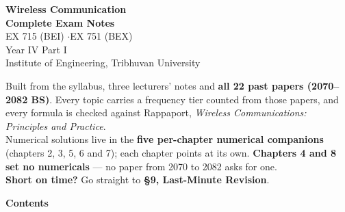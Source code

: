 \documentclass[10pt]{article}
\begin{document}
\thispagestyle{empty}
\vspace*{2.0cm}
\begin{center}
  {\Huge\bfseries\color{acc} Wireless Communication}\\[6pt]
  {\LARGE\bfseries Complete Exam Notes}\\[14pt]
  {\large\color{sub} EX 715 (BEI) \quad$\cdot$\quad EX 751 (BEX)}\\[3pt]
  {\color{sub} Year IV Part I}\\[3pt]
  {\color{sub} Institute of Engineering, Tribhuvan University}\\[20pt]
  \begin{minipage}{0.78\textwidth}
    \color{sub}\small
    Built from the syllabus, three lecturers' notes and \textbf{all 22 past papers
    (2070--2082 BS)}. Every topic carries a frequency tier counted from those papers,
    and every formula is checked against Rappaport, \emph{Wireless Communications:
    Principles and Practice}.\\[8pt]
    Numerical solutions live in the \textbf{five per-chapter numerical companions}
    (chapters 2, 3, 5, 6 and 7); each chapter points at its own.
    \textbf{Chapters 4 and 8 set no numericals} --- no paper from 2070 to 2082 asks for
    one.\\[8pt]
    \textbf{Short on time?} Go straight to \textbf{\S9, Last-Minute Revision}.
  \end{minipage}
\end{center}

\vfill

\vspace{1.2cm}

\cleardoublepage
\pagestyle{fancy}
{\Large\bfseries\color{acc} Contents}
\vspace{-6pt}{\color{acc}\rule{\textwidth}{1.1pt}}\vspace{4pt}
\begingroup
\renewcommand{\contentsname}{}
\setcounter{tocdepth}{1}
\vspace{-24pt}
\tableofcontents
\endgroup

\cleardoublepage

\cleardoublepage

\cleardoublepage

\cleardoublepage

\cleardoublepage

\cleardoublepage

\cleardoublepage

\cleardoublepage




\cleardoublepage
{}
{}

\end{document}
